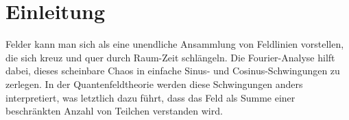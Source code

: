 %
%
%
%

\section{Einleitung\label{fourier:section:einleitung}}


Felder kann man sich als eine unendliche Ansammlung von Feldlinien vorstellen, die sich kreuz und quer durch Raum-Zeit schlängeln. Die Fourier-Analyse hilft dabei, dieses scheinbare Chaos in einfache Sinus- und Cosinus-Schwingungen zu zerlegen. 
In der Quantenfeldtheorie werden diese Schwingungen anders interpretiert, was letztlich dazu führt, dass das Feld als Summe einer beschränkten Anzahl von Teilchen verstanden wird.









